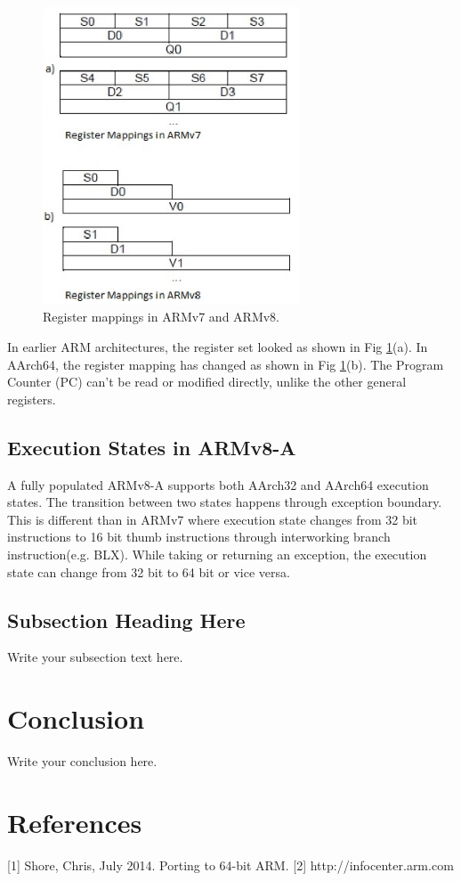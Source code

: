\documentclass[journal]{IEEEtran}
\begin{document}
\begin{figure}
	\centering
    \includegraphics[width=3.0in]{./figures/reg.eps}
    \caption{Register mappings in ARMv7 and ARMv8.}
    \label{fig:Regfig}
\end{figure}

In earlier ARM architectures, the register set looked as shown in Fig \ref{fig:Regfig}(a). In AArch64, the register mapping has changed as shown in Fig \ref{fig:Regfig}(b).
The Program Counter (PC) can't be read or modified directly, unlike the other general registers.

\subsection{Execution States in ARMv8-A}
A fully populated ARMv8-A supports both AArch32 and AArch64 execution states. The transition between two states happens through exception boundary.  This is different than in ARMv7 where execution state changes from 32 bit instructions to 16 bit thumb instructions through interworking branch instruction(e.g. BLX). While taking or returning an exception, the execution state can change from 32 bit to 64 bit or vice versa.

\subsection{Subsection Heading Here}
Write your subsection text here.

\section{Conclusion}
Write your conclusion here.

\section{References}
[1] Shore, Chris, July 2014. Porting to 64-bit ARM.
[2] http://infocenter.arm.com 
\end{document}
